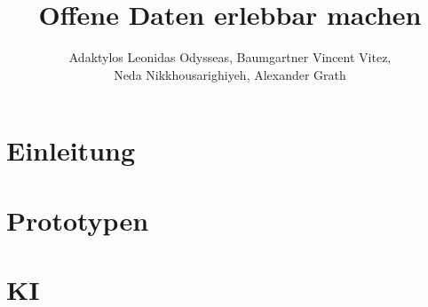 \documentclass{beamer}
\title{Offene Daten erlebbar machen}
\date{}
\author{Adaktylos Leonidas Odysseas, Baumgartner Vincent Vitez,\\ Neda Nikkhousarighiyeh, Alexander Grath}
\begin{document}
  \maketitle
   \section{Einleitung}
  
  
  
  \section{Prototypen}
  
  
  
  
  \section{KI}
  
  
\end{document}
